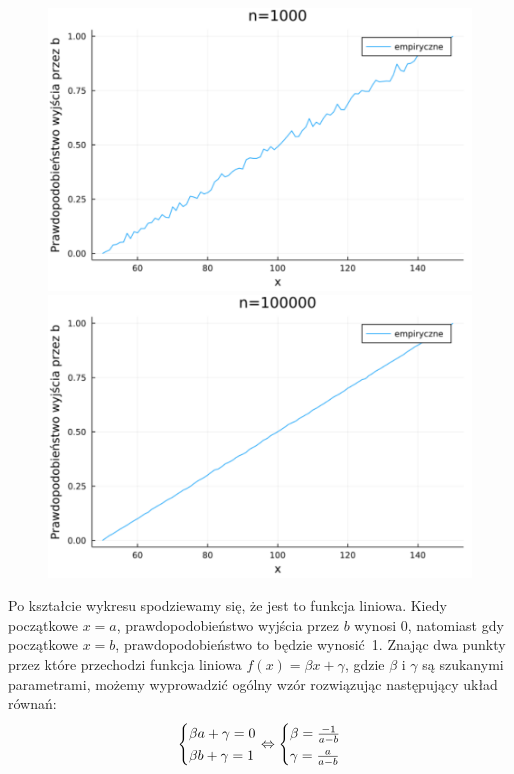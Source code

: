 \documentclass{article}
\makeatletter
\theoremstyle{break}
\newcommand\myarray[1]{%
	\begingroup
	\renewcommand\arraystretch{1.33}
	\left\{ \begin{array}{@{}l@{}} #1 \end{array} \right.
	\endgroup}
\makeatother
\begin{document}
\begin{figure}[H]
	\begin{multicols}{2}
		\begin{center}
			\includegraphics[scale=0.30]{prob100.pdf}
			\caption{}
			\label{fig:5}
			\includegraphics[scale=0.30]{prob100000.pdf}
			\caption{}
			\label{fig:6}
		\end{center}
	\end{multicols}
\end{figure}
Po kształcie wykresu spodziewamy się, że jest to funkcja liniowa. Kiedy początkowe $x=a$, prawdopodobieństwo wyjścia przez $b$ wynosi 0, natomiast gdy początkowe $x=b$, prawdopodobieństwo to będzie wynosić~1. Znając dwa punkty przez które przechodzi funkcja liniowa $f(x)=\beta x+\gamma$, gdzie $\beta$ i $\gamma$ są szukanymi parametrami, możemy wyprowadzić ogólny wzór rozwiązując następujący układ równań:
\[
\myarray{\beta a + \gamma = 0\\ \beta b + \gamma = 1}
\Leftrightarrow
\myarray{\beta = \frac{-1}{a-b} \\ \gamma = \frac{a}{a-b}}
\]
\end{document}
